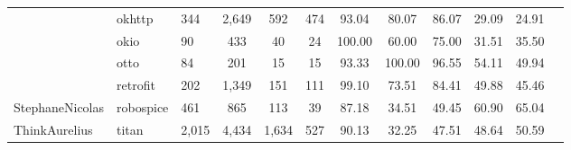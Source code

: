 \begin{table}
{\begin{tabular}{lllccccccccc}
                            & okhttp                                                        & 344             & 2,649            & 592                                                              & 474            & 93.04          & 80.07          & 86.07          & 29.09                                                             & 24.91                                                              \\
                            & okio                                                          & 90              & 433              & 40                                                               & 24             & 100.00         & 60.00          & 75.00          & 31.51                                                             & 35.50                                                              \\
                            & otto                                                          & 84              & 201              & 15                                                               & 15             & 93.33          & 100.00         & 96.55          & 54.11                                                             & 49.94                                                              \\
                            & retrofit                                                      & 202             & 1,349            & 151                                                              & 111            & 99.10          & 73.51          & 84.41          & 49.88                                                             & 45.46                                                              \\ \hline
StephaneNicolas             & robospice                                                     & 461             & 865              & 113                                                              & 39             & 87.18          & 34.51          & 49.45          & 60.90                                                             & 65.04                                                              \\ \hline
ThinkAurelius               & titan                                                         & 2,015           & 4,434             & 1,634                                                            & 527            & 90.13          & 32.25          & 47.51          & 48.64                                                             & 50.59                                                              \\ \hline

\end{tabular}}
\end{table}
